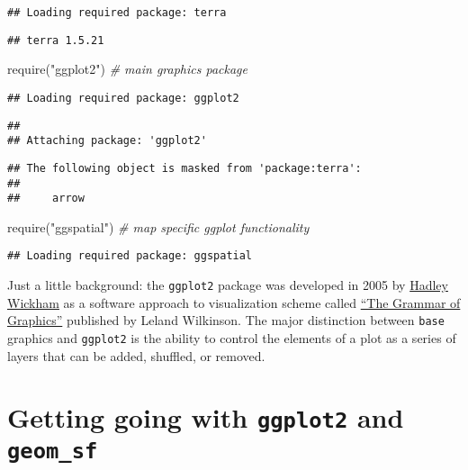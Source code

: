 \documentclass[
]{book}
\newenvironment{Shaded}{\begin{snugshade}}{\end{snugshade}}
\newcommand{\CommentTok}[1]{\textcolor[rgb]{0.56,0.35,0.01}{\textit{#1}}}
\newcommand{\FunctionTok}[1]{\textcolor[rgb]{0.00,0.00,0.00}{#1}}
\newcommand{\NormalTok}[1]{#1}
\newcommand{\StringTok}[1]{\textcolor[rgb]{0.31,0.60,0.02}{#1}}
\begin{document}
\begin{verbatim}
## Loading required package: terra
\end{verbatim}

\begin{verbatim}
## terra 1.5.21
\end{verbatim}

\begin{Shaded}
\begin{Highlighting}[]
\FunctionTok{require}\NormalTok{(}\StringTok{"ggplot2"}\NormalTok{) }\CommentTok{\# main graphics package}
\end{Highlighting}
\end{Shaded}

\begin{verbatim}
## Loading required package: ggplot2
\end{verbatim}

\begin{verbatim}
## 
## Attaching package: 'ggplot2'
\end{verbatim}

\begin{verbatim}
## The following object is masked from 'package:terra':
## 
##     arrow
\end{verbatim}

\begin{Shaded}
\begin{Highlighting}[]
\FunctionTok{require}\NormalTok{(}\StringTok{"ggspatial"}\NormalTok{) }\CommentTok{\# map specific ggplot functionality}
\end{Highlighting}
\end{Shaded}

\begin{verbatim}
## Loading required package: ggspatial
\end{verbatim}

Just a little background: the \texttt{ggplot2} package was developed in 2005 by \href{https://hadley.nz/}{Hadley Wickham} as a software approach to visualization scheme called \href{https://link.springer.com/book/10.1007/0-387-28695-0}{``The Grammar of Graphics''} published by Leland Wilkinson. The major distinction between \texttt{base} graphics and \texttt{ggplot2} is the ability to control the elements of a plot as a series of layers that can be added, shuffled, or removed.

\hypertarget{getting-going-with-ggplot2-and-geom_sf}{%
\chapter{\texorpdfstring{Getting going with \texttt{ggplot2} and \texttt{geom\_sf}}{Getting going with ggplot2 and geom\_sf}}\label{getting-going-with-ggplot2-and-geom_sf}}
\end{document}

